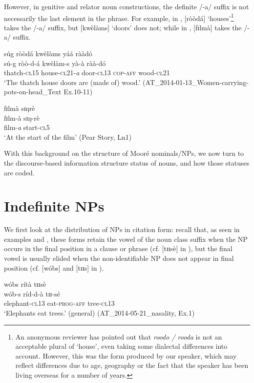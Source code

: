\documentclass[output=paper]{langsci/langscibook}
\begin{document}
However, in genitive and relator noun constructions, the definite /-a/ suffix is not necessarily the last element in the phrase. For example, in , [ròòdá] ‘houses’\footnote{An anonymous reviewer has pointed out that \textit{roodo / rooda} is not an acceptable plural of ‘house’, even taking some dialectal differences into account. However, this was the form produced by our speaker, which may reflect differences due to age, geography or the fact that the speaker has been living overseas for a number of years.} takes the /-a/ suffix, but [kwèlàms] ‘doors’ does not; while in , [fɪlmà] takes the /-a/ suffix.

\ea\label{ex:teo:24}
súg ròòdá kwèlàms yáá rààdó\\
\gll sú-g ròò-d-á kwèlàm-s yà-à ràà-dó\\
thatch-\textsc{cl15} house-\textsc{cl21-}\textit{a} door-\textsc{cl13} \textsc{cop-aff} wood-\textsc{cl21}\\
\glt ‘The thatch house doors are (made of) wood.’ (AT\_2014-01-13\_Women-carrying-pots-on-head\_Text Ex.10-11)
\z

\ea\label{ex:teo:25}
fɪlmà sɪŋrè\\
\gll fɪlm-à sɪŋ-rè\\
film-\textit{a} start-\textsc{cl5}\\
\glt ‘At the start of the film’ (Pear Story, Ln1)
\z

With this background on the structure of Mooré nominals/NPs, we now turn to the discourse-based information structure status of nouns, and how those statuses are coded.

\section{Indefinite NPs}\label{sec:teo:5}

We first look at the distribution of NPs in citation form: recall that, as seen in examples  and , these forms retain the vowel of the noun class suffix when the NP occurs in the final position in a clause or phrase (cf. [tɪɪsè] in ), but the final vowel is usually elided when the non-identifiable NP does not appear in final position (cf. [wóbs] and [tɪɪs] in ).

\ea\label{ex:teo:26}
wóbs rítà tɪɪsè\\
\gll wób-s ríd-d-à tɪɪ-sé\\
elephant-\textsc{cl13} eat-\textsc{prog-aff} tree-\textsc{cl13}\\
\glt ‘Elephants eat trees.’ (general) (AT\_2014-05-21\_nasality, Ex.1)
\z
\end{document}
